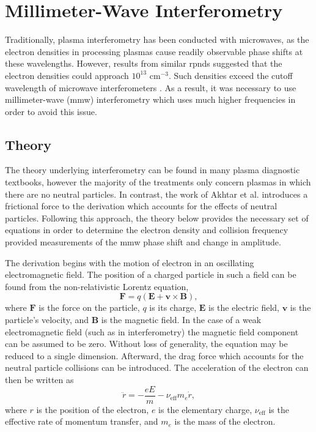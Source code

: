 \section{Millimeter-Wave Interferometry}

Traditionally, plasma interferometry has been conducted with microwaves, as the
electron densities in processing plasmas cause readily observable phase shifts
at these wavelengths. However, results from similar \acs{rpnd}s
\cite{Starikovskaia2001} suggested that the electron densities could approach
$10^{13}$ cm$^{-3}$. Such densities exceed the cutoff wavelength of microwave
interferometers \cite{Lieberman2005}. As a result, it was necessary to use
millimeter-wave (\acs{mmw}) interferometry which uses much higher frequencies in
order to avoid this issue.

\subsection{Theory}

The theory underlying interferometry can be found in many plasma diagnostic
textbooks, however the majority of the treatments only concern plasmas in which
there are no neutral particles. In contrast, the work of Akhtar et al.
\cite{Akhtar2003} introduces a frictional force to the derivation which accounts
for the effects of neutral particles. Following this approach, the theory below
provides the necessary set of equations in order to determine the electron
density and collision frequency provided measurements of the \acs{mmw} phase
shift and change in amplitude.

The derivation begins with the motion of electron in an oscillating
electromagnetic field. The position of a charged particle in such a field can be
found from the non-relativistic Lorentz equation,
  \begin{equation}
    \bm{F} = q\left( \bm{E} + \bm{v} \times \bm{B} \right),
    \label{eqn:lorentz}
  \end{equation}
where $\bm{F}$ is the force on the particle, $q$ is its charge, $\bm{E}$ is the
electric field, $\bm{v}$ is the particle's velocity, and $\bm{B}$ is the
magnetic field. In the case of a weak electromagnetic field (such as in
interferometry) the magnetic field component can be assumed to be zero. Without
loss of generality, the equation may be reduced to a single dimension.
Afterward, the drag force which accounts for the neutral particle collisions can
be introduced. The acceleration of the electron can then be written as
  \begin{equation}
    \ddot{r} = -\frac{e E}{m} - \nu_\mathrm{eff} m_e \dot{r},
  \end{equation}
where $r$ is the position of the electron, $e$ is the elementary charge,
$\nu_\mathrm{eff}$ is the effective rate of momentum transfer, and $m_e$ is the
mass of the electron.

